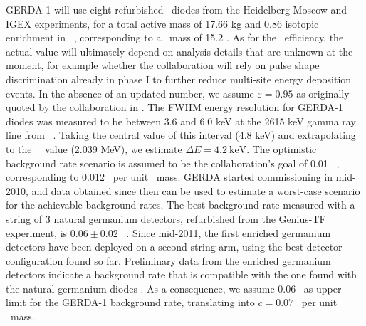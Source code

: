 GERDA-1 will use eight refurbished \GE\ diodes from the Heidelberg-Moscow and IGEX experiments, for a total active mass of 17.66 kg and 0.86 isotopic enrichment in \GE\ \cite{Knopfle:2012zz}, corresponding to a \bb\ mass of 15.2 \kgbb. As for the \bbonu\ efficiency, the actual value will ultimately depend on analysis details that are unknown at the moment, for example whether the collaboration will rely on pulse shape discrimination already in phase I to further reduce multi-site energy deposition events. In the absence of an updated number, we assume $\varepsilon =0.95$ as originally quoted by the collaboration in \cite{Abt:2004yk}. The FWHM energy resolution for GERDA-1 diodes was measured to be between 3.6 and 6.0 keV at the 2615 keV gamma ray line from \TL\ \cite{Cattadori:2012fy}. Taking the central value of this interval (4.8 keV) and extrapolating to the \GE\ \Qbb\ value (2.039 MeV), we estimate $\Delta E= 4.2\ \text{keV}$. The optimistic background rate scenario is assumed to be the collaboration's goal of 0.01 \ckky\ \cite{Abt:2004yk}, corresponding to 0.012 \ckkbby\ per unit \bb\ mass. GERDA started commissioning in mid-2010, and data obtained since then can be used to estimate a worst-case scenario for the achievable background rates. The best background rate measured with a string of 3 natural germanium detectors, refurbished from the Genius-TF experiment, is $0.06\pm 0.02$ \ckky\ \cite{Cattadori:2012fy}. Since mid-2011, the first enriched germanium detectors have been deployed on a second string arm, using the best detector configuration found so far. Preliminary data from the enriched germanium detectors indicate a background rate that is compatible with the one found with the natural germanium diodes \cite{Cattadori:2012fy}. As a consequence, we assume 0.06 \ckky\ as upper limit for the GERDA-1 background rate, translating into $c=0.07$ \ckkbby\ per unit \bb\ mass.

